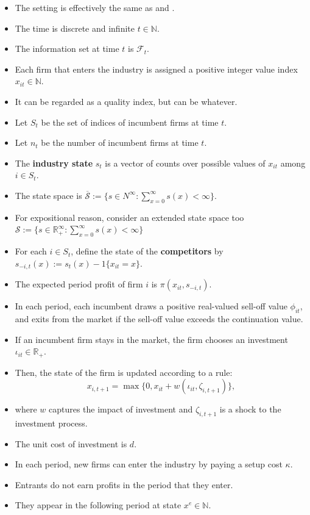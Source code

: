 \documentclass[
]{book}
\providecommand{\tightlist}{%
  \setlength{\itemsep}{0pt}\setlength{\parskip}{0pt}}
\begin{document}
\begin{itemize}
\tightlist
\item
  The setting is effectively the same as \citet{ericsonMarkovPerfectIndustryDynamics1995} and \citet{doraszelskiComputableMarkovperfectIndustry2010}.
\item
  The time is discrete and infinite \(t \in \mathbb{N}\).
\item
  The information set at time \(t\) is \(\mathcal{F}_t\).
\item
  Each firm that enters the industry is assigned a positive integer value index \(x_{it} \in \mathbb{N}\).
\item
  It can be regarded as a quality index, but can be whatever.
\item
  Let \(S_t\) be the set of indices of incumbent firms at time \(t\).
\item
  Let \(n_t\) be the number of incumbent firms at time \(t\).
\item
  The \textbf{industry state} \(s_t\) is a vector of counts over possible values of \(x_{it}\) among \(i \in S_t\).
\item
  The state space is \(\overline{\mathcal{S}} := \{s \in N^{\infty}: \sum_{x = 0}^\infty s(x) < \infty\}\).
\item
  For expositional reason, consider an extended state space too \(\mathcal{S} := \{s \in \mathbb{R}_+^{\infty}: \sum_{x = 0}^\infty s(x) < \infty\}\)
\item
  For each \(i \in S_{t}\), define the state of the \textbf{competitors} by \(s_{-i, t}(x) := s_t(x) - 1\{x_{it} = x\}\).
\item
  The expected period profit of firm \(i\) is \(\pi(x_{it}, s_{-i, t})\).
\item
  In each period, each incumbent draws a positive real-valued sell-off value \(\phi_{it}\), and exits from the market if the sell-off value exceeds the continuation value.
\item
  If an incumbent firm stays in the market, the firm chooses an investment \(\iota_{it} \in \mathbb{R}_+\).
\item
  Then, the state of the firm is updated according to a rule:
  \[
  x_{i, t + 1} = \max\{0, x_{it} + w(\iota_{it}, \zeta_{i, t + 1})\},
  \]
\item
  where \(w\) captures the impact of investment and \(\zeta_{i, t + 1}\) is a shock to the investment process.
\item
  The unit cost of investment is \(d\).
\item
  In each period, new firms can enter the industry by paying a setup cost \(\kappa\).
\item
  Entrants do not earn profits in the period that they enter.
\item
  They appear in the following period at state \(x^e \in \mathbb{N}\).
\end{itemize}
\end{document}
